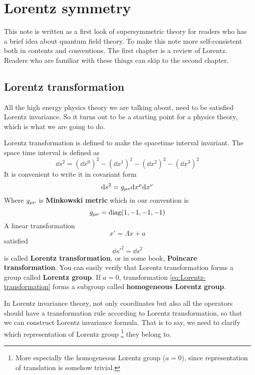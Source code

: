 \chapter{Lorentz symmetry}

This note is written as a first look of supersymmetric theory for readers who has a brief idea about quantum field theory. To make this note more self-consistent both in contents and conventions. The first chapter is a review of Lorentz.  Readers who are familiar with these things can skip to the second chapter.

\section{Lorentz transformation}

All the high energy physics theory we are talking about, need to be satisfied Lorentz invariance. So it turns out to be a starting point for a physics theory, which is what we are going to do.

Lorentz transformation is defined to make the spacetime interval invariant. The space time interval is defined as
\begin{equation}
  \dd s^2 = (\dd x^0)^2-(\dd x^1)^2-(\dd x^2)^2-(\dd x^3)^2
\end{equation}
It is convenient to write it in covariant form
\begin{equation}
  \dd s^2 =g_{\mu\nu}\dd x^{\mu}\dd x^{\nu}
\end{equation}
Where $g_{\mu\nu}$ is \textbf{Minkowski metric} which in our convention is
\begin{equation}
  g_{\mu\nu} =\text{diag}(1,-1,-1,-1)
\end{equation}
A linear transformation
\begin{equation} \label{eq:Lorentz-transformation}
  x' = \Lambda x + a
\end{equation}
satisfied
\begin{equation} \label{eq:Lorentz-invariance}
  \dd s'^2=\dd s^2
\end{equation}
is called \textbf{Lorentz transformation}, or in some book, \textbf{Poincare transformation}. You can easily verify that Lorentz transformation forms a group called \textbf{Lorentz group}. If $a = 0$, transformation \eqref{eq:Lorentz-transformation} forms a subgroup called \textbf{homogeneous Lorentz group}.

In Lorentz invariance theory, not only coordinates but also all the operators should have a transformation rule according to Lorentz transformation, so that we can construct Lorentz invariance formula. That is to say, we need to clarify which representation of Lorentz group \footnote{More especially the homogeneous Lorentz group ($a=0$), since representation of translation is somehow trivial.} they belong to.

